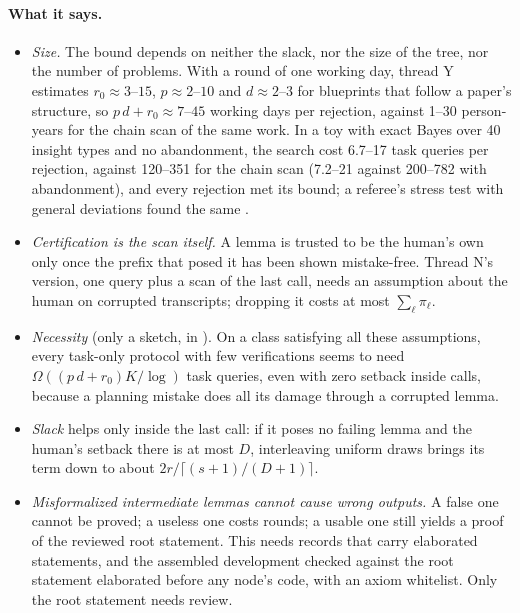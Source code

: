 \documentclass[11pt]{article}
\theoremstyle{definition}
\theoremstyle{remark}
\newcommand{\K}{K}
\begin{document}
\paragraph{What it says.}
\begin{itemize}[nosep]
\item \emph{Size.} The bound depends on neither the slack, nor the size of the tree, nor the number of problems. With a round of one working day, thread Y estimates $r_0\approx3$--$15$, $p\approx2$--$10$ and $d\approx2$--$3$ for blueprints that follow a paper's structure, so $p\,d+r_0\approx7$--$45$ working days per rejection, against 1--30 person-years for the chain scan of the same work. In a toy with exact Bayes over 40 insight types and no abandonment, the search cost 6.7--17 task queries per rejection, against 120--351 for the chain scan (7.2--21 against 200--782 with abandonment), and every rejection met its bound; a referee's stress test with general deviations found the same \cite{referee10}.
\item \emph{Certification is the scan itself.} A lemma is trusted to be the human's own only once the prefix that posed it has been shown mistake-free. Thread N's version, one query plus a scan of the last call, needs an assumption about the human on corrupted transcripts; dropping it costs at most $\sum_\ell\pi_\ell$.
\item \emph{Necessity} (only a sketch, in \cite{threadY}). On a class satisfying all these assumptions, every task-only protocol with few verifications seems to need $\Omega((p\,d+r_0)\K/\log)$ task queries, even with zero setback inside calls, because a planning mistake does all its damage through a corrupted lemma.
\item \emph{Slack} helps only inside the last call: if it poses no failing lemma and the human's setback there is at most $D$, interleaving uniform draws brings its term down to about $2r/\lceil(s+1)/(D+1)\rceil$.
\item \emph{Misformalized intermediate lemmas cannot cause wrong outputs.} A false one cannot be proved; a useless one costs rounds; a usable one still yields a proof of the reviewed root statement. This needs records that carry elaborated statements, and the assembled development checked against the root statement elaborated before any node's code, with an axiom whitelist. Only the root statement needs review.
\end{itemize}
\end{document}
